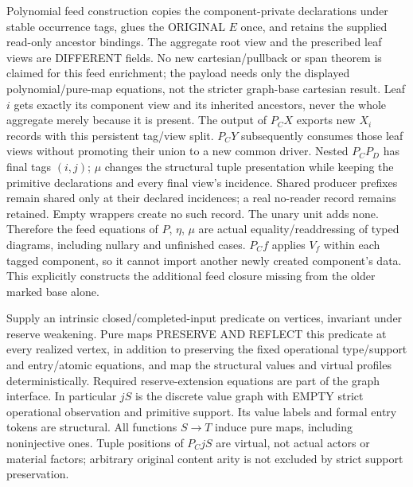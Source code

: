 \documentclass[11pt]{article}
\begin{document}
Polynomial feed construction copies the component-private declarations under stable occurrence tags, glues the ORIGINAL $E$ once, and retains the supplied read-only ancestor bindings. The aggregate root view and the prescribed leaf views are DIFFERENT fields. No new cartesian/pullback or span theorem is claimed for this feed enrichment; the payload needs only the displayed polynomial/pure-map equations, not the stricter graph-base cartesian result. Leaf $i$ gets exactly its component view and its inherited ancestors, never the whole aggregate merely because it is present. The output of $P_CX$ exports new $X_i$ records with this persistent tag/view split. $P_CY$ subsequently consumes those leaf views without promoting their union to a new common driver. Nested $P_CP_D$ has final tags $(i,j)$; $\mu$ changes the structural tuple presentation while keeping the primitive declarations and every final view's incidence. Shared producer prefixes remain shared only at their declared incidences; a real no-reader record remains retained. Empty wrappers create no such record. The unary unit adds none. Therefore the feed equations of $P$, $\eta$, $\mu$ are actual equality/readdressing of typed diagrams, including nullary and unfinished cases. $P_Cf$ applies $V_f$ within each tagged component, so it cannot import another newly created component's data. This explicitly constructs the additional feed closure missing from the older marked base alone.

Supply an intrinsic closed/completed-input predicate on vertices, invariant under reserve weakening. Pure maps PRESERVE AND REFLECT this predicate at every realized vertex, in addition to preserving the fixed operational type/support and entry/atomic equations, and map the structural values and virtual profiles deterministically. Required reserve-extension equations are part of the graph interface. In particular $jS$ is the discrete value graph with EMPTY strict operational observation and primitive support. Its value labels and formal entry tokens are structural. All functions $S\to T$ induce pure maps, including noninjective ones. Tuple positions of $P_CjS$ are virtual, not actual actors or material factors; arbitrary original content arity is not excluded by strict support preservation.
\end{document}
